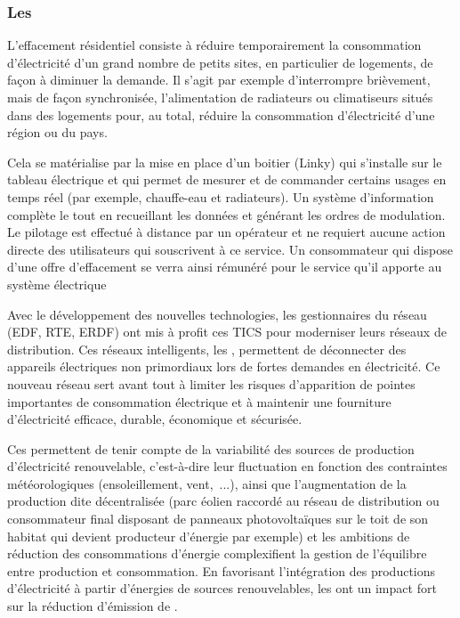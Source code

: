 \subsubsection{Les \smartgrids{}}

L'effacement résidentiel consiste à réduire temporairement la consommation d'électricité d'un grand nombre de petits sites, en particulier de logements, de façon à diminuer la demande. Il s'agit par exemple d'interrompre brièvement, mais de façon synchronisée, l'alimentation de radiateurs ou climatiseurs situés dans des logements pour, au total, réduire la consommation d'électricité d'une région ou du pays.

Cela se matérialise par la mise en place d'un boitier (Linky) qui s'installe sur le tableau électrique et qui permet de mesurer et de commander certains usages en temps réel (par exemple, chauffe-eau et radiateurs). Un système d'information complète le tout en recueillant les données et générant les ordres de modulation. Le pilotage est effectué à distance par un opérateur et ne requiert aucune action directe des utilisateurs qui souscrivent à ce service. Un consommateur qui dispose d'une offre d'effacement se verra ainsi rémunéré pour le service qu'il apporte au système électrique

Avec le développement des nouvelles technologies, les gestionnaires du réseau (EDF, RTE, ERDF) ont mis à profit ces TICS pour moderniser leurs réseaux de distribution. Ces réseaux intelligents, les \smartgrids{}, permettent de déconnecter des appareils électriques non primordiaux lors de fortes demandes en électricité. Ce nouveau réseau sert avant tout à limiter les risques d'apparition de pointes importantes de consommation électrique et à maintenir une fourniture d'électricité efficace, durable, économique et sécurisée.

Ces \smartgrids{} permettent de tenir compte de la variabilité des sources de production d'électricité renouvelable, c'est-à-dire leur fluctuation en fonction des contraintes météorologiques (ensoleillement, vent,~...), ainsi que l'augmentation de la production dite décentralisée (parc éolien raccordé au réseau de distribution ou consommateur final disposant de panneaux photovoltaïques sur le toit de son habitat qui devient producteur d'énergie par exemple) et les ambitions de réduction des consommations d'énergie complexifient la gestion de l'équilibre entre production et consommation. En favorisant l'intégration des productions d'électricité à partir d'énergies de sources renouvelables, les \smartgrids{} ont un impact fort sur la réduction d'émission de .

